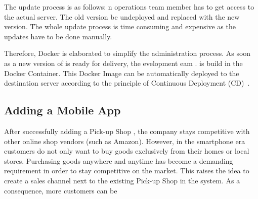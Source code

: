 The  update process is as follows:
n operations team member has to get access to the actual server.
The old version  be undeployed and replaced with the new version. 
The whole update process is time consuming and expensive as the updates have to be done manually.

Therefore, Docker is elaborated to simplify the administration process. 
As soon as a new  version of \CoCoME is ready for delivery, the evelopment eam .
\CoCoME is build in the Docker Container.
This Docker Image can be automatically deployed to the destination server according to the principle of Continuous Deployment (CD)~\cite{olsson2012climbing}. 




\subsection{Adding a Mobile App}
After successfully adding a Pick-up Shop
, the \CoCoME company stays competitive with other online shop vendors (such as Amazon). 
However, in the smartphone era customers do not only want to buy goods exclusively from their homes or local stores. %
Purchasing goods anywhere and anytime has become a demanding requirement in order to stay competitive on the market. %
This raises the idea to create a  sales channel next to the existing Pick-up Shop  in the \CoCoME system. 
As a consequence, more customers can be  

